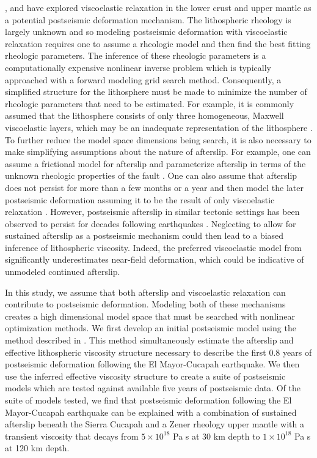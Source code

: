 \documentclass[1p]{elsarticle}
\begin{document}
\citet{Pollitz2012}, \citet{Rollins2015} and \citet{Spinler2015} have explored viscoelastic relaxation in the lower crust and upper mantle as a potential postseismic deformation mechanism. The lithospheric rheology is largely unknown and so modeling postseismic deformation with viscoelastic relaxation requires one to assume a rheologic model and then find the best fitting rheologic parameters.  The inference of these rheologic parameters is a computationally expensive nonlinear inverse problem which is typically approached with a forward modeling grid search method.  Consequently, a simplified structure for the lithosphere must be made to minimize the number of rheologic parameters that need to be estimated.  For example, it is commonly assumed that the lithosphere consists of only three homogeneous, Maxwell viscoelastic layers, which may be an inadequate representation of the lithosphere \citep[e.g.][]{Riva2009,Hines2013}. To further reduce the model space dimensions being search, it is also necessary to make simplifying assumptions about the nature of afterslip. For example, one can assume a frictional model for afterslip and parameterize afterslip in terms of the unknown rheologic properties of the fault \citep[e.g.][]{Johnson2009,Johnson2004}. One can also assume that afterslip does not persist for more than a few months or a year and then model the later postseismic deformation assuming it to be the result of only viscoelastic relaxation \citep[e.g.][]{Pollitz2012,Spinler2015}. However, postseismic afterslip in similar tectonic settings has been observed to persist for decades following earthquakes \citep{Cakir2012,Cetin2014}. Neglecting to allow for sustained afterslip as a postseismic mechanism could then lead to a biased inference of lithospheric viscosity. Indeed, the preferred viscoelastic model from \citet{Pollitz2012} significantly underestimates near-field deformation, which could be indicative of unmodeled continued afterslip.

In this study, we assume that both afterslip and viscoelastic relaxation can contribute to postseismic deformation. Modeling both of these mechanisms creates a high dimensional model space that must be searched with nonlinear optimization methods. We first develop an initial postseismic model using the method described in \citet{Hines2015}. This method simultaneously estimate the afterslip and effective lithospheric viscosity structure necessary to describe the first 0.8 years of postseismic deformation following the El Mayor-Cucapah earthquake.  We then use the inferred effective viscosity structure to create a suite of postseismic models which are tested against available five years of postseismic data.  Of the suite of models tested, we find that postseismic deformation following the El Mayor-Cucapah earthquake can be explained with a combination of sustained afterslip beneath the Sierra Cucapah and a Zener rheology upper mantle with a transient viscosity that decays from $5\times10^{18}$ Pa s at 30 km depth to $1\times10^{18}$ Pa s at 120 km depth. 
\end{document}
